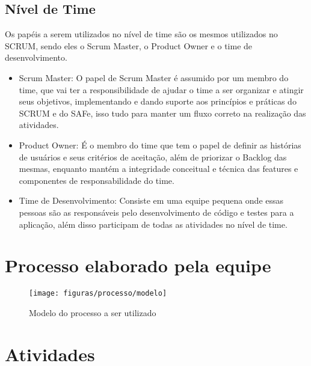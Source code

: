 \subsection{Nível de Time}
Os papéis a serem utilizados no nível de time são os mesmos utilizados no SCRUM, sendo eles o Scrum Master, o Product Owner e o time de desenvolvimento.

\begin{itemize}
\item Scrum Master: O papel de Scrum Master é assumido por um membro do time, que vai ter a responsibilidade de ajudar o time a ser organizar e atingir seus objetivos, implementando e dando suporte aos princípios e práticas do SCRUM e do SAFe, isso tudo para manter um fluxo correto na realização das atividades.
\item Product Owner: É o membro do time que tem o papel de definir as histórias de usuários e seus critérios de aceitação, além de priorizar o Backlog das mesmas, enquanto mantém a integridade conceitual e técnica das features e componentes de responsabilidade do time.
\item Time de Desenvolvimento: Consiste em uma equipe pequena onde essas pessoas são as responsáveis pelo desenvolvimento de código e testes para a aplicação, além disso participam de todas as atividades no nível de time.
\end{itemize}

\newpage
\section{Processo elaborado pela equipe}
\begin{figure}[!htpb]
\centering	
\texttt{[image: figuras/processo/modelo]}
\caption{Modelo do processo a ser utilizado}
\end{figure}

\newpage

\section{Atividades}


